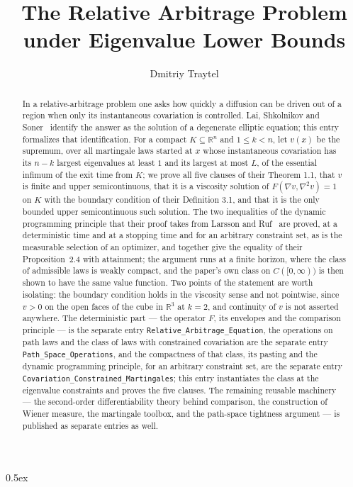\documentclass[11pt,a4paper]{article}
\begin{document}
\title{The Relative Arbitrage Problem under Eigenvalue Lower Bounds}
\author{Dmitriy Traytel}
\maketitle

\begin{abstract}
  In a relative-arbitrage problem one asks how quickly a diffusion can be
  driven out of a region when only its instantaneous covariation is
  controlled.  Lai, Shkolnikov and Soner~\cite{LaiShkolnikovSoner} identify
  the answer as the solution of a degenerate elliptic equation; this entry
  formalizes that identification.  For a compact $K \subseteq \mathbb{R}^n$
  and $1 \le k < n$, let $v(x)$ be the supremum, over all martingale laws
  started at $x$ whose instantaneous covariation has its $n-k$ largest
  eigenvalues at least $1$ and its largest at most $L$, of the essential
  infimum of the exit time from $K$; we prove all five clauses of their
  Theorem 1.1, that $v$ is finite and upper semicontinuous, that it is a
  viscosity solution of $F(\nabla v, \nabla^{2} v) = 1$ on $K$ with the
  boundary condition of their Definition 3.1, and that it is the only bounded
  upper semicontinuous such solution.  The two inequalities of the dynamic
  programming principle that their proof takes from Larsson and
  Ruf~\cite{LarssonRuf} are proved, at a deterministic time and at a
  stopping time and for an arbitrary constraint set, as is the measurable
  selection of an optimizer, and together give the equality of their
  Proposition~2.4 with attainment; the argument runs at a finite horizon, where the
  class of admissible laws is weakly compact, and the paper's own class on
  $C([0,\infty))$ is then shown to have the same value function.  Two points
  of the statement are worth isolating: the boundary condition holds in the
  viscosity sense and not pointwise, since $v > 0$ on the open faces of the
  cube in $\mathbb{R}^{3}$ at $k = 2$, and continuity of $v$ is not asserted
  anywhere.  The deterministic part --- the operator $F$, its envelopes and
  the comparison principle --- is the separate entry
  \texttt{Relative\_Arbitrage\_Equation}, the operations on path laws
  and the class of laws with constrained covariation are the separate entry
  \texttt{Path\_Space\_Operations}, and the compactness of that class,
  its pasting and the dynamic programming principle, for an arbitrary
  constraint set, are the separate entry
  \texttt{Covariation\_Constrained\_Martingales}; this entry instantiates
  the class at the eigenvalue constraints and proves the five clauses.  The remaining reusable machinery --- the
  second-order differentiability theory behind comparison, the construction
  of Wiener measure, the martingale toolbox, and the path-space tightness
  argument --- is published as separate entries as well.
\end{abstract}

\tableofcontents

\parindent 0pt\parskip 0.5ex





\end{document}
